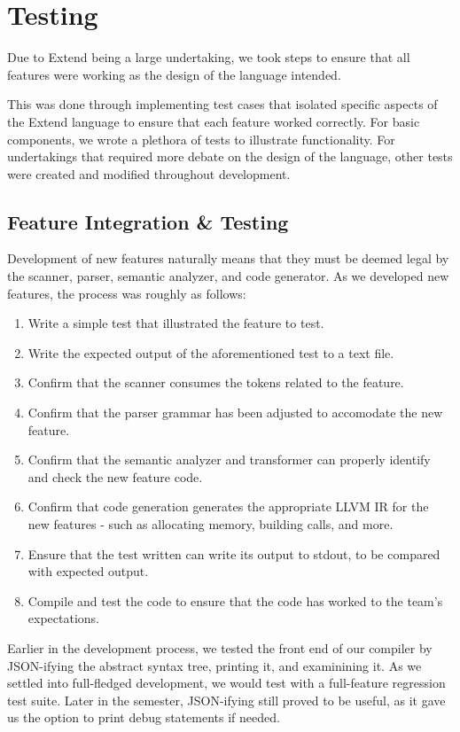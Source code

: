 \chapter{Testing}
Due to Extend being a large undertaking, we took steps to ensure that all features were working as the design of the language intended.

\medskip \noindent
This was done through implementing test cases that isolated specific aspects of the Extend language to ensure that each feature worked correctly. For basic components, we wrote a plethora of tests to illustrate functionality. For undertakings that required more debate on the design of the language, other tests were created and modified throughout development.

\section{Feature Integration \& Testing}
Development of new features naturally means that they must be deemed legal by the scanner, parser, semantic analyzer, and code generator. As we developed new features, the process was roughly as follows:
  \begin{enumerate}
    \item Write a simple test that illustrated the feature to test.
    \item Write the expected output of the aforementioned test to a text file.
    \item Confirm that the scanner consumes the tokens related to the feature.
    \item Confirm that the parser grammar has been adjusted to accomodate the new feature.
    \item Confirm that the semantic analyzer and transformer can properly identify and check the new feature code.
    \item Confirm that code generation generates the appropriate LLVM IR for the new features - such as allocating memory, building calls, and more.
    \item Ensure that the test written can write its output to stdout, to be compared with expected output.
    \item Compile and test the code to ensure that the code has worked to the team's expectations.
  \end{enumerate}

  \medskip \noindent
  Earlier in the development process, we tested the front end of our compiler by JSON-ifying the abstract syntax tree, printing it, and examinining it. As we settled into full-fledged development, we would test with a full-feature regression test suite.
  Later in the semester, JSON-ifying still proved to be useful, as it gave us the option to print debug statements if needed.


